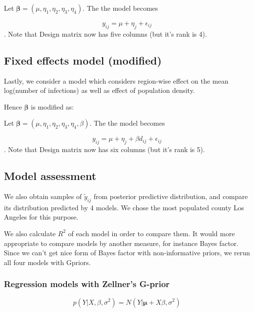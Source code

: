 \documentclass[11pt,twocolumn]{asaproc}
\begin{document}
Let $\pmb{\beta} =  (\mu, \eta_1, \eta_2, \eta_3, \eta_4)$. The the model becomes 
 
 $$y_{ij} = \mu + \eta_j + \epsilon_{ij}$$. Note that Design matrix now has five columns (but it's rank is 4). 
 




\subsection{Fixed effects model (modified)}

Lastly, we consider a model which considers region-wise effect on the mean log(number of infections) as well as effect of population density. 
 
Hence $\pmb{\beta}$ is modified as: 
 
 Let $\pmb{\beta} =  (\mu, \eta_1, \eta_2, \eta_3, \eta_4, \beta)$. The the model becomes 
 
 $$y_{ij} = \mu + \eta_j + \beta d_{ij} +  \epsilon_{ij}$$. Note that Design matrix now has six columns (but it's rank is 5). 
 




\subsection{Model assessment} %

We also obtain samples of $\tilde{y}_{ij}$ from posterior predictive distribution, and compare its distribution predicted by 4 models. We chose the most populated county Los Angeles for this purpose. 

We also calculate $R^2$ of each model in order to compare them. It would more appropriate to compare models by another measure, for instance Bayes factor. Since we can't get nice form of Bayes factor with non-informative priors, we re\-run all four models with G\-priors. 

\subsubsection{Regression models with Zellner's G-prior}

$$p(Y | X, \beta, \sigma^2) = N(Y | \pmb{\mu} + X\beta, \sigma^2)$$
\end{document}
